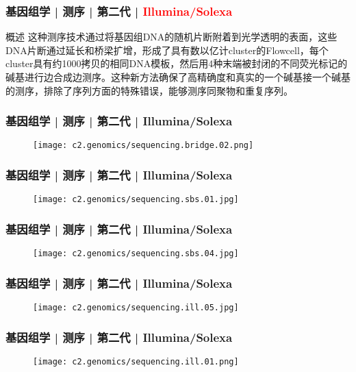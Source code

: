 \begin{frame}
  \frametitle{基因组学 | 测序 | 第二代 | \textcolor{red}{Illumina/Solexa}}
  \begin{block}{概述}
这种测序技术通过将基因组DNA的随机片断附着到光学透明的表面，这些DNA片断通过延长和桥梁扩增，形成了具有数以亿计cluster的Flowcell，每个cluster具有约1000拷贝的相同DNA模板，然后用4种末端被封闭的不同荧光标记的碱基进行边合成边测序。这种新方法确保了高精确度和真实的一个碱基接一个碱基的测序，排除了序列方面的特殊错误，能够测序同聚物和重复序列。
  \end{block}
\end{frame}

\begin{frame}
  \frametitle{基因组学 | 测序 | 第二代 | Illumina/Solexa}
  \begin{figure}
    \centering
    \texttt{[image: c2.genomics/sequencing.bridge.02.png]}
  \end{figure}
\end{frame}

\begin{frame}
  \frametitle{基因组学 | 测序 | 第二代 | Illumina/Solexa}
  \begin{figure}
    \centering
    \texttt{[image: c2.genomics/sequencing.sbs.01.jpg]}
  \end{figure}
\end{frame}

\begin{frame}
  \frametitle{基因组学 | 测序 | 第二代 | Illumina/Solexa}
  \begin{figure}
    \centering
    \texttt{[image: c2.genomics/sequencing.sbs.04.jpg]}
  \end{figure}
\end{frame}

\begin{frame}
  \frametitle{基因组学 | 测序 | 第二代 | Illumina/Solexa}
  \begin{figure}
    \centering
    \texttt{[image: c2.genomics/sequencing.ill.05.jpg]}
  \end{figure}
\end{frame}

\begin{frame}
  \frametitle{基因组学 | 测序 | 第二代 | Illumina/Solexa}
  \begin{figure}
    \centering
    \texttt{[image: c2.genomics/sequencing.ill.01.png]}
  \end{figure}
\end{frame}


